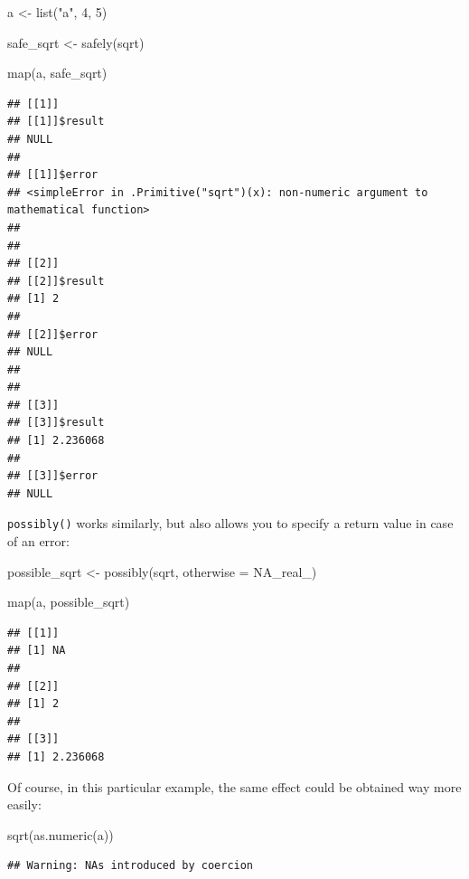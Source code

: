 \documentclass[
]{article}
\newenvironment{Shaded}{\begin{snugshade}}{\end{snugshade}}
\newcommand{\AttributeTok}[1]{\textcolor[rgb]{0.77,0.63,0.00}{#1}}
\newcommand{\ConstantTok}[1]{\textcolor[rgb]{0.00,0.00,0.00}{#1}}
\newcommand{\DecValTok}[1]{\textcolor[rgb]{0.00,0.00,0.81}{#1}}
\newcommand{\FunctionTok}[1]{\textcolor[rgb]{0.00,0.00,0.00}{#1}}
\newcommand{\NormalTok}[1]{#1}
\newcommand{\OtherTok}[1]{\textcolor[rgb]{0.56,0.35,0.01}{#1}}
\newcommand{\StringTok}[1]{\textcolor[rgb]{0.31,0.60,0.02}{#1}}
\begin{document}
\begin{Shaded}
\begin{Highlighting}[]
\NormalTok{a }\OtherTok{\textless{}{-}} \FunctionTok{list}\NormalTok{(}\StringTok{"a"}\NormalTok{, }\DecValTok{4}\NormalTok{, }\DecValTok{5}\NormalTok{)}

\NormalTok{safe\_sqrt }\OtherTok{\textless{}{-}} \FunctionTok{safely}\NormalTok{(sqrt)}

\FunctionTok{map}\NormalTok{(a, safe\_sqrt)}
\end{Highlighting}
\end{Shaded}

\begin{verbatim}
## [[1]]
## [[1]]$result
## NULL
## 
## [[1]]$error
## <simpleError in .Primitive("sqrt")(x): non-numeric argument to mathematical function>
## 
## 
## [[2]]
## [[2]]$result
## [1] 2
## 
## [[2]]$error
## NULL
## 
## 
## [[3]]
## [[3]]$result
## [1] 2.236068
## 
## [[3]]$error
## NULL
\end{verbatim}

\texttt{possibly()} works similarly, but also allows you to specify a return value in case of an error:

\begin{Shaded}
\begin{Highlighting}[]
\NormalTok{possible\_sqrt }\OtherTok{\textless{}{-}} \FunctionTok{possibly}\NormalTok{(sqrt, }\AttributeTok{otherwise =} \ConstantTok{NA\_real\_}\NormalTok{)}

\FunctionTok{map}\NormalTok{(a, possible\_sqrt)}
\end{Highlighting}
\end{Shaded}

\begin{verbatim}
## [[1]]
## [1] NA
## 
## [[2]]
## [1] 2
## 
## [[3]]
## [1] 2.236068
\end{verbatim}

Of course, in this particular example, the same effect could be obtained way more easily:

\begin{Shaded}
\begin{Highlighting}[]
\FunctionTok{sqrt}\NormalTok{(}\FunctionTok{as.numeric}\NormalTok{(a))}
\end{Highlighting}
\end{Shaded}

\begin{verbatim}
## Warning: NAs introduced by coercion
\end{verbatim}
\end{document}
